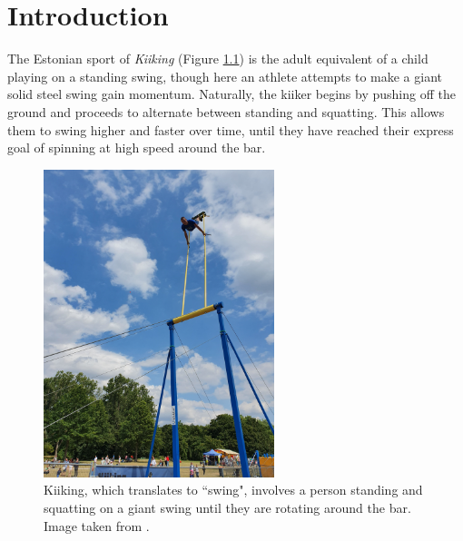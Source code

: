 

\chapter{Introduction}

The Estonian sport of \textit{Kiiking} (Figure \ref{fig:kiiking}) is the adult
equivalent of a child playing on a standing swing, though here
an athlete attempts to make a giant solid steel swing gain momentum.
Naturally, the kiiker begins by pushing off the ground and proceeds to alternate
between standing and squatting. 
This allows them to swing higher and faster over time, until they have reached
their express goal of spinning at high speed around the bar.

\begin{figure}[ht]
    \centering
    \includegraphics[width=0.6\textwidth,angle=270]{images/kiiking.jpg}
    \caption{Kiiking, which translates to ``swing", involves a person standing
        and squatting on a giant swing until they are rotating around the bar.
    Image taken from \cite{kiiking-img}.}
    \label{fig:kiiking}
\end{figure}


